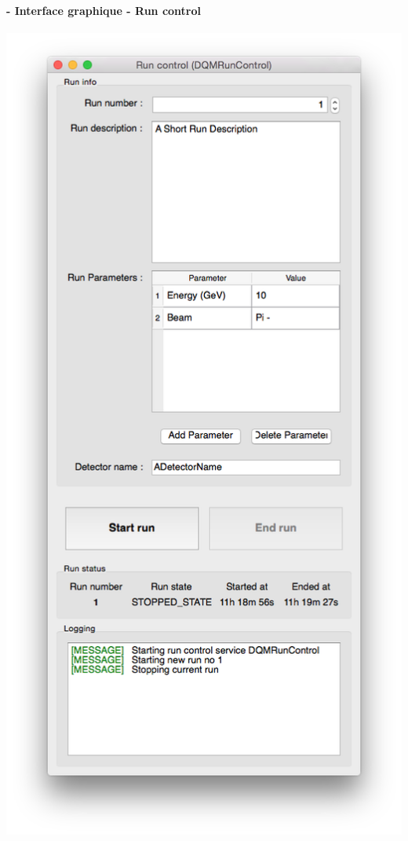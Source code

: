 \documentclass[8pt]{beamer}
\begin{document}
  \begin{frame}
  \frametitle{\secname}
  \framesubtitle{\subsecname - Interface graphique - Run control}

    \begin{minipage}{0.3\linewidth}
      \includegraphics[width=1.3\linewidth]{RunControl.png}

\end{minipage}
\end{frame}
\end{document}
